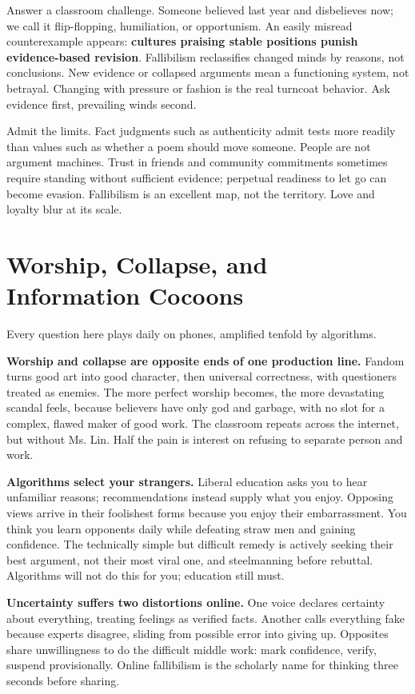 Answer a classroom challenge. Someone believed last year and disbelieves now; we call it flip-flopping, humiliation, or opportunism. An easily misread counterexample appears: \textbf{cultures praising stable positions punish evidence-based revision}. Fallibilism reclassifies changed minds by reasons, not conclusions. New evidence or collapsed arguments mean a functioning system, not betrayal. Changing with pressure or fashion is the real turncoat behavior. Ask evidence first, prevailing winds second.

Admit the limits. Fact judgments such as authenticity admit tests more readily than values such as whether a poem should move someone. People are not argument machines. Trust in friends and community commitments sometimes require standing without sufficient evidence; perpetual readiness to let go can become evasion. Fallibilism is an excellent map, not the territory. Love and loyalty blur at its scale.

\section{Worship, Collapse, and Information Cocoons}
Every question here plays daily on phones, amplified tenfold by algorithms.

\textbf{Worship and collapse are opposite ends of one production line.} Fandom turns good art into good character, then universal correctness, with questioners treated as enemies. The more perfect worship becomes, the more devastating scandal feels, because believers have only god and garbage, with no slot for a complex, flawed maker of good work. The classroom repeats across the internet, but without Ms. Lin. Half the pain is interest on refusing to separate person and work.

\textbf{Algorithms select your strangers.} Liberal education asks you to hear unfamiliar reasons; recommendations instead supply what you enjoy. Opposing views arrive in their foolishest forms because you enjoy their embarrassment. You think you learn opponents daily while defeating straw men and gaining confidence. The technically simple but difficult remedy is actively seeking their best argument, not their most viral one, and steelmanning before rebuttal. Algorithms will not do this for you; education still must.

\textbf{Uncertainty suffers two distortions online.} One voice declares certainty about everything, treating feelings as verified facts. Another calls everything fake because experts disagree, sliding from possible error into giving up. Opposites share unwillingness to do the difficult middle work: mark confidence, verify, suspend provisionally. Online fallibilism is the scholarly name for thinking three seconds before sharing.

